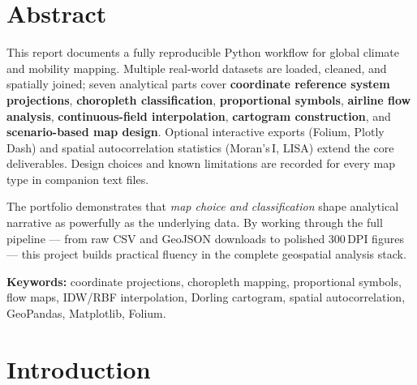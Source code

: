 \documentclass[12pt, a4paper, oneside]{report}
\begin{document}
\nopagecolor   %

\clearpage
\thispagestyle{plain}
\chapter*{Abstract}

\begin{infobox}
This report documents a fully reproducible Python workflow for global climate and mobility
mapping. Multiple real-world datasets are loaded, cleaned, and spatially joined; seven
analytical parts cover \textbf{coordinate reference system projections},
\textbf{choropleth classification}, \textbf{proportional symbols},
\textbf{airline flow analysis}, \textbf{continuous-field interpolation},
\textbf{cartogram construction}, and \textbf{scenario-based map design}.
Optional interactive exports (Folium, Plotly Dash) and spatial autocorrelation
statistics (Moran's\,I, LISA) extend the core deliverables. Design choices and
known limitations are recorded for every map type in companion text files.
\end{infobox}

\vspace{0.8em}
The portfolio demonstrates that \emph{map choice and classification} shape analytical
narrative as powerfully as the underlying data. By working through the full pipeline ---
from raw CSV and GeoJSON downloads to polished 300\,DPI figures --- this project builds
practical fluency in the complete geospatial analysis stack.

\bigskip
\noindent\textbf{Keywords:} coordinate projections, choropleth mapping, proportional
symbols, flow maps, IDW/RBF interpolation, Dorling cartogram, spatial autocorrelation,
GeoPandas, Matplotlib, Folium.

\clearpage
\tableofcontents

\clearpage
\listoffigures
{}

\listoftables
{}

\chapter{Introduction}
\end{document}
